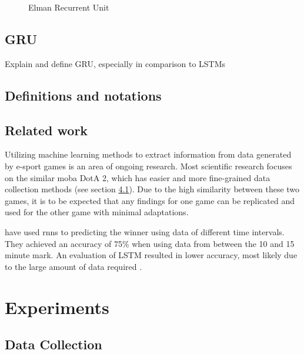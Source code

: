 \documentclass[12pt, a4paper, headinclude, twoside, plainheadsepline, open=right, numbers=noenddot, hidelinks, toc=listof, toc=bibliography]{scrreprt}
\begin{document}
\begin{figure}
\centering
{}
\caption{Elman Recurrent Unit}
\end{figure}


\section{GRU}
\label{sec:gru}

Explain and define GRU, especially in comparison to LSTMs


\section{Definitions and notations}
\label{sec:defandnot}


\section{Related work}
\label{sec:related}

Utilizing machine learning methods to extract information from data generated by e-sport games is an area of ongoing research.
Most scientific research focuses on the similar \ac{moba} DotA 2, which has easier and more fine-grained data collection methods (see section \ref{sec:datacoll}).
Due to the high similarity between these two games, it is to be expected that any findings for one game can be replicated and used for the other game with minimal adaptations.

 have used \acp{rnn} to predicting the winner using data of different time intervals. They achieved an accuracy of 75\% when using data from between the 10 and 15 minute mark.
An evaluation of LSTM resulted in lower accuracy, most likely due to the large amount of data required \cite{silvaContinuousOutcomePrediction2018}.






\chapter{Experiments}
\label{chap:experiments}

\section{Data Collection}
\label{sec:datacoll}
\end{document}
